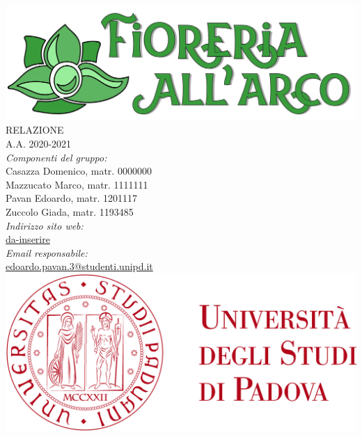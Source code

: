 \thispagestyle{empty}
\begin{titlepage}
	\begin{center}
		
		\includegraphics[scale = 0.05]{../latex/images/logotitle.png}\\[1.5cm]
\Huge \textsc{RELAZIONE \doctitle{}}\\ [0.75cm]                          
\Large \textsf{A.A. 2020-2021} \\ [1cm]
		

\Large \textsl{Componenti del gruppo:} \\[0.25cm] \textsf{Casazza Domenico, matr. 0000000} \\ [0.1cm]
\Large \textsf{Mazzucato Marco, matr. 1111111} \\ [0.1cm]
\Large \textsf{Pavan Edoardo, matr. 1201117} \\ [0.1cm]
\Large \textsf{Zuccolo Giada, matr. 1193485} \\ [1.75cm]
                
\Large \textsl{Indirizzo sito web:} \\ \textsf{\href{http://www.google.it}{da-inserire}}\\[0.25cm]
\Large \textsl{Email responsabile:}\\ 
\textsf{\href{edoardo.pavan.3@studenti.unipd.it}{edoardo.pavan.3@studenti.unipd.it}}\\[1cm]

		\includegraphics[scale = 0.055]{../latex/images/logoUniPD.png}


	\end{center}
\end{titlepage}